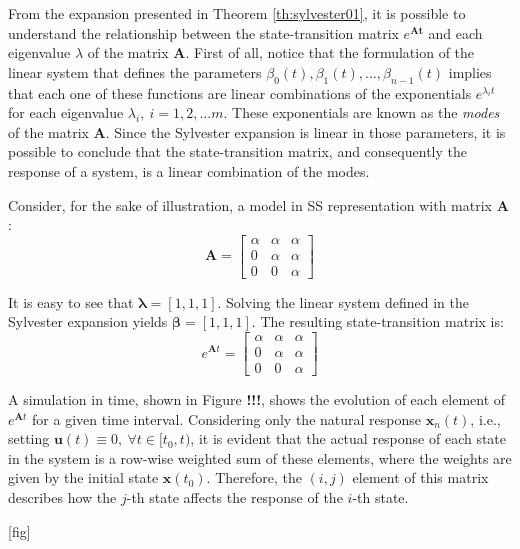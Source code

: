 \documentclass[a4paper,11pt]{book}
\numberwithin{figure}{chapter}
\numberwithin{equation}{chapter}
\numberwithin{table}{chapter}
\theoremstyle{definition}
\begin{document}
From the expansion presented in Theorem \ref{th:sylvester01}, it is possible to understand the relationship between the state-transition matrix $e^{\bm{At}}$ and each eigenvalue $\lambda$ of the matrix $\bm{A}$. First of all, notice that the formulation of the linear system that defines the parameters $\beta_0(t), \beta_1(t), ..., \beta_{n-1}(t)$ implies that each one of these functions are linear combinations of the exponentials $e^{\lambda_i t}$ for each eigenvalue $\lambda_i,\ i=1,2,...m$. These exponentials are known as the \textit{modes} of the matrix $\bm{A}$. Since the Sylvester expansion is linear in those parameters, it is possible to conclude that the state-transition matrix, and consequently the response of a system, is a linear combination of the modes.

Consider, for the sake of illustration, a model in SS representation with matrix $\bm{A}$:
\begin{equation}
    \bm{A} = \begin{bmatrix} 
        \alpha & \alpha & \alpha \\
        0 & \alpha & \alpha \\
        0 & 0 & \alpha
    \end{bmatrix}
\end{equation}

It is easy to see that $\bm{\lambda} = [1, 1, 1]$. Solving the linear system defined in the Sylvester expansion yields $\bm{\beta} = [1, 1, 1]$. The resulting state-transition matrix is: 
\begin{equation}
    e^{\bm{A} t} = \begin{bmatrix} 
        \alpha & \alpha & \alpha \\
        0 & \alpha & \alpha \\
        0 & 0 & \alpha
    \end{bmatrix}
\end{equation}

A simulation in time, shown in Figure \textbf{!!!}, shows the evolution of each element of $e^{\bm{A} t}$ for a given time interval. Considering only the natural response $\bm{x}_n(t)$, i.e., setting $\bm{u}(t) \equiv 0,\ \forall t \in [t_0, t)$, it is evident that the actual response of each state in the system is a row-wise weighted sum of these elements, where the weights are given by the initial state $\bm{x}(t_0)$. Therefore, the $(i, j)$ element of this matrix describes how the $j$-th state affects the response of the $i$-th state.

[fig]
\end{document}
